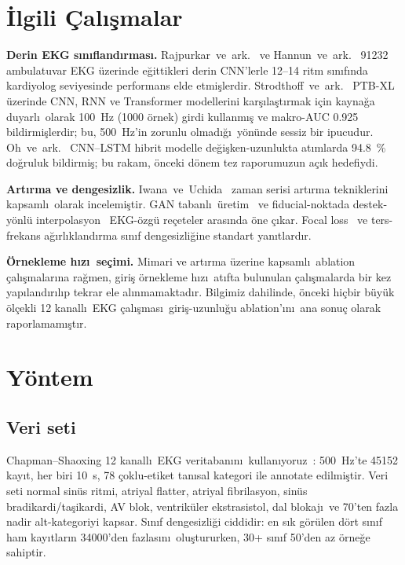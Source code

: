 \documentclass[conference]{IEEEtran}
\begin{document}
\section{\.{I}lgili \c{C}al\i\c{s}malar}
\textbf{Derin EKG s\i n\i fland\i rmas\i.}
Rajpurkar~ve~ark.~\cite{rajpurkar2017} ve
Hannun~ve~ark.~\cite{hannun2019} \num{91232} ambulatuvar EKG \"{u}zerinde
e\u{g}ittikleri derin CNN'lerle 12--14 ritm s\i n\i f\i nda kardiyolog
seviyesinde performans elde etmi\c{s}lerdir.
Strodthoff~ve~ark.~\cite{strodthoff2020} PTB-XL~\cite{wagner2020}
\"{u}zerinde CNN, RNN ve Transformer modellerini kar\c{s}\i la\c{s}t\i rmak
i\c{c}in kayna\u{g}a duyarl\i\ olarak \SI{100}{\hertz} (\num{1000} \"{o}rnek)
girdi kullanm\i\c{s} ve makro-AUC \num{0,925} bildirmi\c{s}lerdir; bu,
\SI{500}{\hertz}'in zorunlu olmad\i\u{g}\i\ y\"{o}n\"{u}nde sessiz bir ipucudur.
Oh~ve~ark.~\cite{oh2018} CNN--LSTM hibrit modelle de\u{g}i\c{s}ken-uzunlukta
at\i mlarda \SI{94,8}{\percent} do\u{g}ruluk bildirmi\c{s}; bu rakam,
\"{o}nceki d\"{o}nem tez raporumuzun a\c{c}\i k hedefiydi.

\textbf{Art\i rma ve dengesizlik.}
Iwana~ve~Uchida~\cite{iwana2021} zaman serisi art\i rma tekniklerini
kapsaml\i\ olarak incelemi\c{s}tir. GAN tabanl\i\ \"{u}retim~\cite{wang2020}
ve fiducial-noktada destek-y\"{o}nl\"{u} interpolasyon~\cite{chen2021,xu2022}
EKG-\"{o}zg\"{u} re\c{c}eteler aras\i nda \"{o}ne \c{c}\i kar. Focal
loss~\cite{lin2017} ve ters-frekans a\u{g}\i rl\i kland\i rma s\i n\i f
dengesizli\u{g}ine standart yan\i tlard\i r.

\textbf{\"{O}rnekleme h\i z\i\ se\c{c}imi.}
Mimari ve art\i rma \"{u}zerine kapsaml\i\ ablation \c{c}al\i\c{s}malar\i na
ra\u{g}men, giri\c{s} \"{o}rnekleme h\i z\i\ at\i fta bulunulan \c{c}al\i\c{s}malarda bir
kez yap\i land\i r\i l\i p tekrar ele al\i nmamaktad\i r. Bilgimiz dahilinde,
\"{o}nceki hi\c{c}bir b\"{u}y\"{u}k \"{o}l\c{c}ekli 12 kanall\i\ EKG \c{c}al\i\c{s}mas\i\
giri\c{s}-uzunlu\u{g}u ablation'\i n\i\ ana sonu\c{c} olarak raporlamam\i\c{s}t\i r.

\section{Y\"{o}ntem}
\subsection{Veri seti}
Chapman--Shaoxing 12 kanall\i\ EKG veritaban\i n\i\ kullan\i yoruz~\cite{zheng2020}:
\SI{500}{\hertz}'te \num{45152} kay\i t, her biri \SI{10}{\second}, \num{78}
\c{c}oklu-etiket tan\i sal kategori ile annotate edilmi\c{s}tir. Veri seti normal
sin\"{u}s ritmi, atriyal flatter, atriyal fibrilasyon, sin\"{u}s
bradikardi/ta\c{s}ikardi, AV blok, ventrik\"{u}ler ekstrasistol, dal blokaj\i\
ve \num{70}'ten fazla nadir alt-kategoriyi kapsar. S\i n\i f
dengesizli\u{g}i ciddidir: en s\i k g\"{o}r\"{u}len d\"{o}rt s\i n\i f ham
kay\i tlar\i n \num{34000}'den fazlas\i n\i\ olu\c{s}tururken, \num{30}+ s\i n\i f
\num{50}'den az \"{o}rne\u{g}e sahiptir.
\end{document}
